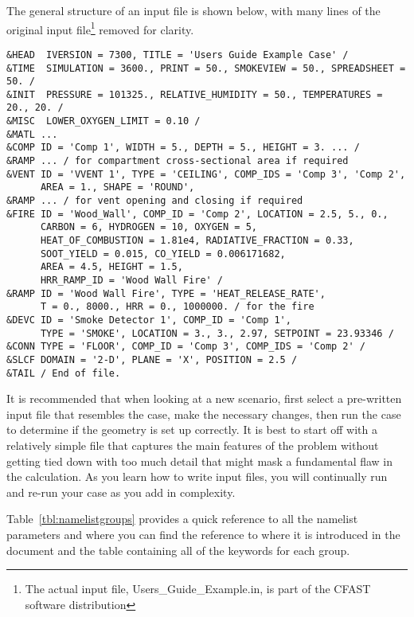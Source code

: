 The general structure of an input file is shown below, with many lines of the original input file\footnote{The actual input file, Users\_Guide\_Example.in, is part of the CFAST software distribution} removed for clarity.

\begin{lstlisting}
&HEAD  IVERSION = 7300, TITLE = 'Users Guide Example Case' /
&TIME  SIMULATION = 3600., PRINT = 50., SMOKEVIEW = 50., SPREADSHEET = 50. /
&INIT  PRESSURE = 101325., RELATIVE_HUMIDITY = 50., TEMPERATURES = 20., 20. /
&MISC  LOWER_OXYGEN_LIMIT = 0.10 /
&MATL ...
&COMP ID = 'Comp 1', WIDTH = 5., DEPTH = 5., HEIGHT = 3. ... /
&RAMP ... / for compartment cross-sectional area if required
&VENT ID = 'VVENT 1', TYPE = 'CEILING', COMP_IDS = 'Comp 3', 'Comp 2',
      AREA = 1., SHAPE = 'ROUND',
&RAMP ... / for vent opening and closing if required
&FIRE ID = 'Wood_Wall', COMP_ID = 'Comp 2', LOCATION = 2.5, 5., 0.,
      CARBON = 6, HYDROGEN = 10, OXYGEN = 5,
      HEAT_OF_COMBUSTION = 1.81e4, RADIATIVE_FRACTION = 0.33,
      SOOT_YIELD = 0.015, CO_YIELD = 0.006171682,
      AREA = 4.5, HEIGHT = 1.5,
      HRR_RAMP_ID = 'Wood Wall Fire' /
&RAMP ID = 'Wood Wall Fire', TYPE = 'HEAT_RELEASE_RATE',
      T = 0., 8000., HRR = 0., 1000000. / for the fire
&DEVC ID = 'Smoke Detector 1', COMP_ID = 'Comp 1',
      TYPE = 'SMOKE', LOCATION = 3., 3., 2.97, SETPOINT = 23.93346 /
&CONN TYPE = 'FLOOR', COMP_ID = 'Comp 3', COMP_IDS = 'Comp 2' /
&SLCF DOMAIN = '2-D', PLANE = 'X', POSITION = 2.5 /
&TAIL / End of file.
\end{lstlisting}
It is recommended that when looking at a new scenario, first select a pre-written input file that resembles the case, make the necessary changes, then run the case to determine if the geometry is set up correctly. It is best to start off with a relatively simple file that captures the main features of the problem without getting tied down with too much detail that might mask a fundamental flaw in the calculation. As you learn how to write input files, you will continually run and re-run your case as you add in complexity.

Table~\ref{tbl:namelistgroups} provides a quick reference to all the namelist parameters and where you can find the reference to where it is introduced in the document and the table containing all of the keywords for each group.


